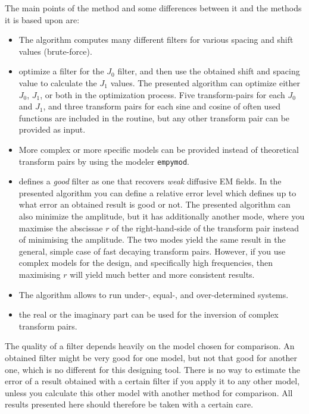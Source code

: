 \documentclass[paper,twocolumn,twoside]{geophysics}
\begin{document}
The main points of the method and some differences between it and the methods
it is based upon are:
\begin{itemize}
  \item The algorithm computes many different filters for various spacing and
    shift values (brute-force).
  \item \cite{GP.07.Kong, GEO.12.Key} optimize a filter for the $J_0$ filter,
    and then use the obtained shift and spacing value to calculate the $J_1$
    values. The presented algorithm can optimize either $J_0$, $J_1$, or both
    in the optimization process. Five transform-pairs for each $J_0$ and $J_1$,
    and three transform pairs for each sine and cosine of often used functions
    are included in the routine, but any other transform pair can be provided
    as input.
  \item More complex or more specific models can be provided instead of
    theoretical transform pairs by using the modeler \texttt{empymod}.
  \item \cite{GP.07.Kong} defines a \emph{good} filter as one that recovers
    \emph{weak} diffusive EM fields. In the presented algorithm you can define
    a relative error level which defines up to what error an obtained result is
    good or not. The presented algorithm can also minimize the amplitude, but
    it has additionally another mode, where you maximise the abscissae $r$ of
    the right-hand-side of the transform pair instead of minimising the
    amplitude. The two modes yield the same result in the general, simple case
    of fast decaying transform pairs. However, if you use complex models for
    the design, and specifically high frequencies, then maximising $r$ will
    yield much better and more consistent results.
  \item The algorithm allows to run under-, equal-, and over-determined
    systems.
  \item the real or the imaginary part can be used for the inversion of complex
    transform pairs.
\end{itemize}

The quality of a filter depends heavily on the model chosen for comparison. An
obtained filter might be very good for one model, but not that good for another
one, which is no different for this designing tool. There is no way to estimate
the error of a result obtained with a certain filter if you apply it to any
other model, unless you calculate this other model with another method for
comparison. All results presented here should therefore be taken with a certain
care.
\end{document}
